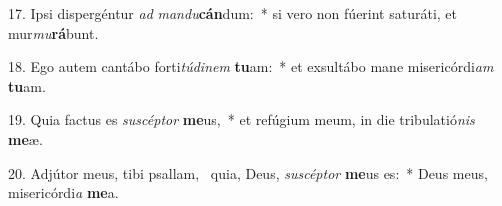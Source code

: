 17. Ipsi dispergéntur \textit{ad} \textit{man}\textit{du}\textbf{cán}dum:~*  si vero non fúerint saturáti, et mur\textit{mu}\textbf{rá}bunt.\

18. Ego autem cantábo forti\textit{tú}\textit{di}\textit{nem} \textbf{tu}am:~*  et exsultábo mane misericórdi\textit{am} \textbf{tu}am.\

19. Quia factus es \textit{su}\textit{scép}\textit{tor} \textbf{me}us,~*  et refúgium meum, in die tribulatió\textit{nis} \textbf{me}æ.\

20. Adjútor meus, tibi psallam, \dag\  quia, Deus, \textit{su}\textit{scép}\textit{tor} \textbf{me}us es:~*  Deus meus, misericórdi\textit{a} \textbf{me}a.\

